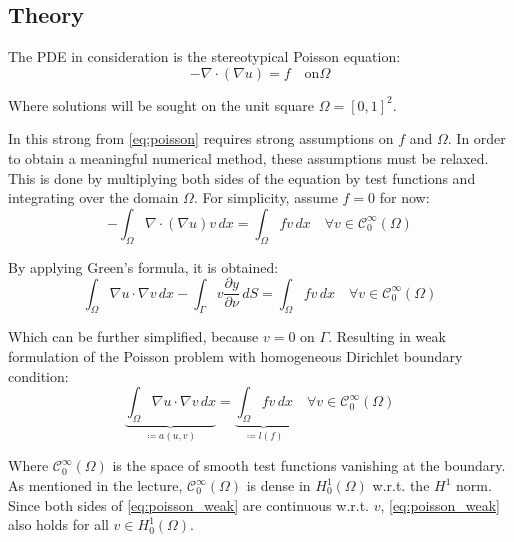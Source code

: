 \documentclass[11pt,a4paper]{article}
\begin{document}
\begin{multicols}{2}

  \subsection*{Theory}
    The PDE in consideration is the stereotypical Poisson equation:
    \begin{equation}
      - \nabla \cdot \left( \nabla u \right) = f \quad \text{on} \Omega
    \end{equation}

    Where solutions will be sought on the unit square $\Omega = \left[0,1\right]^2$.

    In this strong from \ref{eq:poisson} requires strong assumptions on $f$ and $\Omega$.
    In order to obtain a meaningful numerical method, these assumptions must be relaxed.
    This is done by multiplying both sides of the equation by test functions and integrating over the domain $\Omega$.
    For simplicity, assume $f = 0$ for now:
    \begin{equation}
      \label{eq:poisson_weak}
      - \int_\Omega \nabla \cdot \left(\nabla u\right) v \,dx = \int_\Omega fv \,dx
        \quad \forall v \in \mathcal{C}^\infty_0(\Omega)
    \end{equation}

    By applying Green's formula, it is obtained:
    \begin{equation}
      \int_\Omega \nabla u \cdot \nabla v \,dx - \int_\Gamma v \frac{\partial y}{\partial \nu} \,dS = \int_\Omega fv \,dx
        \quad \forall v \in \mathcal{C}^\infty_0(\Omega)
    \end{equation}

    Which can be further simplified, because $v = 0$ on $\Gamma$.
    Resulting in weak formulation of the Poisson problem with homogeneous Dirichlet boundary condition:
    \begin{equation}
      \underbrace{\int_\Omega \nabla u \cdot \nabla v \,dx}_{\coloneqq a(u,v)} = \underbrace{\int_\Omega fv \,dx}_{\coloneqq l(f)}
        \quad \forall v \in \mathcal{C}^\infty_0(\Omega)
    \end{equation}

    Where $\mathcal{C}^\infty_0(\Omega)$ is the space of smooth test functions vanishing at the boundary.
    As mentioned in the lecture, $\mathcal{C}^\infty_0(\Omega)$ is dense in $H^1_0(\Omega)$ w.r.t. the $H^1$ norm.
    Since both sides of \ref{eq:poisson_weak} are continuous w.r.t. $v$, \ref{eq:poisson_weak} also holds for all $v \in H^1_0(\Omega)$.


\end{multicols}
\end{document}
